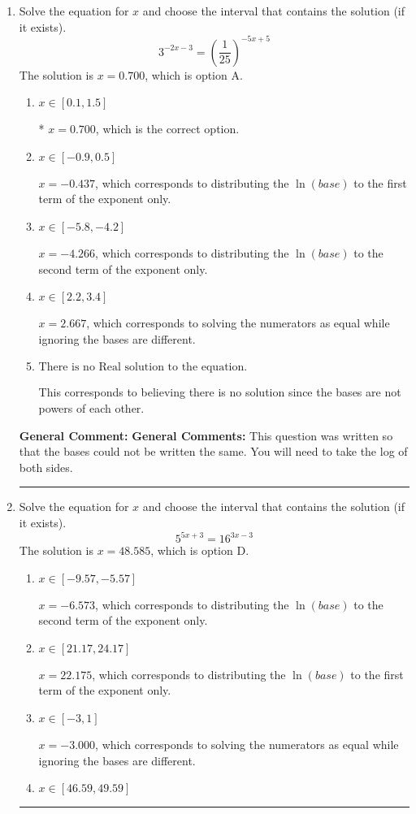 \documentclass{extbook}[14pt]
\newcommand{\litem}[1]{\item #1

\rule{\textwidth}{0.4pt}}
\begin{document}
\begin{enumerate}\litem{
Solve the equation for $x$ and choose the interval that contains the solution (if it exists).
\[ 3^{-2x-3} = \left(\frac{1}{25}\right)^{-5x+5} \]
The solution is \( x = 0.700 \), which is option A.\begin{enumerate}[label=\Alph*.]
\item \( x \in [0.1, 1.5] \)

* $x = 0.700$, which is the correct option.
\item \( x \in [-0.9, 0.5] \)

$x = -0.437$, which corresponds to distributing the $\ln(base)$ to the first term of the exponent only.
\item \( x \in [-5.8, -4.2] \)

$x = -4.266$, which corresponds to distributing the $\ln(base)$ to the second term of the exponent only.
\item \( x \in [2.2, 3.4] \)

$x = 2.667$, which corresponds to solving the numerators as equal while ignoring the bases are different.
\item \( \text{There is no Real solution to the equation.} \)

This corresponds to believing there is no solution since the bases are not powers of each other.
\end{enumerate}

\textbf{General Comment:} \textbf{General Comments:} This question was written so that the bases could not be written the same. You will need to take the log of both sides.
}
\litem{
Solve the equation for $x$ and choose the interval that contains the solution (if it exists).
\[ 5^{5x+3} = 16^{3x-3} \]
The solution is \( x = 48.585 \), which is option D.\begin{enumerate}[label=\Alph*.]
\item \( x \in [-9.57, -5.57] \)

$x = -6.573$, which corresponds to distributing the $\ln(base)$ to the second term of the exponent only.
\item \( x \in [21.17, 24.17] \)

$x = 22.175$, which corresponds to distributing the $\ln(base)$ to the first term of the exponent only.
\item \( x \in [-3, 1] \)

$x = -3.000$, which corresponds to solving the numerators as equal while ignoring the bases are different.
\item \( x \in [46.59, 49.59] \)


\end{enumerate}}
\end{enumerate}
\end{document}
